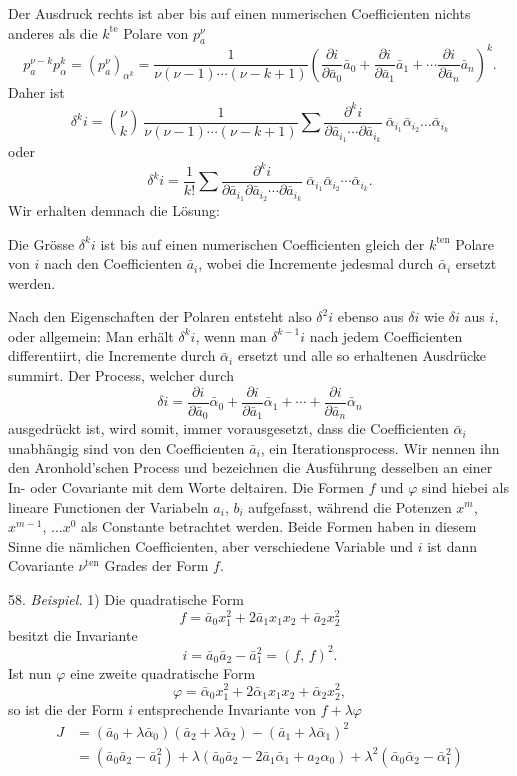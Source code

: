 \documentclass[11pt]{article}
\providecommand{\weberpage}[1]{}
\begin{document}
\weberpage{62}
Der Ausdruck rechts ist aber bis auf einen numerischen Coefficienten
nichts anderes als die $k^{\text{te}}$ Polare von $p_a^\nu$
\[
p_a^{\nu-k}p_\alpha^k = (p_a^\nu)_{\alpha^k} = \frac{1}{\nu(\nu-1)\cdots(\nu-k+1)}\left(\frac{\partial i}{\partial \bar a_0}\bar a_0+\frac{\partial i}{\partial \bar a_1}\bar a_1+\cdots\frac{\partial i}{\partial \bar a_n}\bar a_n\right)^k.
\]
Daher ist
\[
\delta^k i = \binom{\nu}{k}\ \frac{1}{\nu(\nu-1)\cdots(\nu-k+1)}\sum\frac{\partial^k i}{\partial\bar a_{i_1}\cdots\partial\bar a_{i_k}}\ \bar\alpha_{i_1}\bar\alpha_{i_2}\ldots\bar\alpha_{i_k}
\]
oder
\[
\delta^k i = \frac{1}{k!}\sum\frac{\partial^k i}{\partial\bar a_{i_1}\partial\bar a_{i_2}\cdots\partial\bar a_{i_k}}\ \bar\alpha_{i_1}\bar\alpha_{i_2}\cdots\bar\alpha_{i_k}. \tag{II}
\]
Wir erhalten demnach die Lösung:

\glqq Die Grösse $\delta^k i$ ist bis auf einen numerischen Coefficienten
gleich der $k^{\text{ten}}$ Polare von $i$ nach den Coefficienten $\bar a_i$, wobei
die Incremente jedesmal durch $\bar\alpha_i$ ersetzt werden.\grqq{}

Nach den Eigenschaften der Polaren entsteht also $\delta^2 i$ ebenso aus
$\delta i$ wie $\delta i$ aus $i$, oder allgemein: Man erhält $\delta^k i$, wenn man $\delta^{k-1}i$ nach
jedem Coefficienten differentiirt, die Incremente durch $\bar\alpha_i$ ersetzt und
alle so erhaltenen Ausdrücke summirt. Der Process, welcher durch
\[
\delta i = \frac{\partial i}{\partial \bar a_0}\bar\alpha_0 + \frac{\partial i}{\partial \bar a_1}\bar\alpha_1 + \cdots + \frac{\partial i}{\partial \bar a_n}\bar\alpha_n
\]
ausgedrückt ist, wird somit, immer vorausgesetzt, dass die Coefficienten $\bar\alpha_i$
unabhängig sind von den Coefficienten $\bar a_i$, ein Iterationsprocess. Wir
nennen ihn den Aronhold'schen Process und bezeichnen die Aus\-führung desselben an einer In- oder Covariante mit dem Worte \glqq del\-tairen\grqq{}. Die Formen $f$ und $\varphi$ sind hiebei als lineare Functionen der
Variabeln $a_i$, $b_i$ aufgefasst, während die Potenzen $x^m$, $x^{m-1}$, $\ldots x^0$
als Constante betrachtet werden. Beide Formen haben in diesem
Sinne die nämlichen Coefficienten, aber verschiedene Variable und $i$
ist dann Covariante $\nu^{\text{ten}}$ Grades der Form $f$.

58. \textit{Beispiel.} 1) Die quadratische Form
\[
f = \bar a_0 x_1^2 + 2\bar a_1 x_1 x_2 + \bar a_2 x_2^2
\]
besitzt die Invariante
\[
i = \bar a_0 \bar a_2 - \bar a_1^2 = (f,\,f)^2.
\]
Ist nun $\varphi$ eine zweite quadratische Form
\[
\varphi = \bar\alpha_0 x_1^2 + 2\bar\alpha_1 x_1 x_2 + \bar\alpha_2 x_2^2,
\]
so ist die der Form $i$ entsprechende Invariante von $f+\lambda\varphi$
\[
\begin{aligned}
J &= (\bar a_0+\lambda\bar\alpha_0)(\bar a_2+\lambda\bar\alpha_2)-(\bar a_1+\lambda\bar\alpha_1)^2\\
&= (\bar a_0\bar a_2-\bar a_1^2) + \lambda(\bar a_0\bar a_2-2\bar a_1\bar\alpha_1+a_2\alpha_0) + \lambda^2(\bar\alpha_0\bar\alpha_2-\bar\alpha_1^2) %
\end{aligned}
\]
\end{document}
